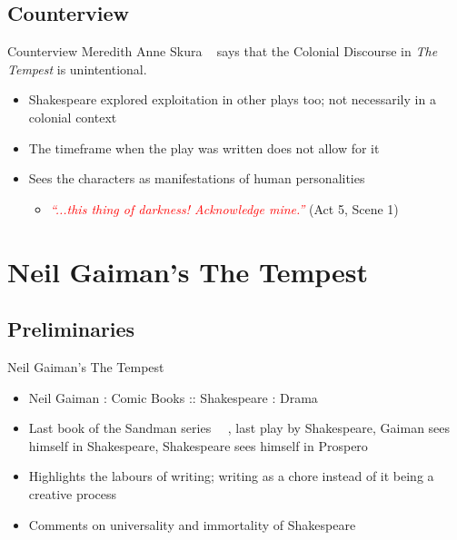 \documentclass{beamer}
\begin{document}
  \subsection{Counterview}
  \begin{frame}{Counterview}
  Meredith Anne Skura ~\cite{1989} says that the Colonial Discourse in \emph{The Tempest} is unintentional. 
  \begin{itemize}
  \item Shakespeare explored exploitation in other plays too; not necessarily in a colonial context
  \item The timeframe when the play was written does not allow for it
  \item Sees the characters as manifestations of human personalities
    \begin{itemize}
    \item \textcolor{red}{\emph{``...this thing of darkness! Acknowledge mine.''}} (Act 5, Scene 1)
    \end{itemize}
  \end{itemize}
  \end{frame}

  \section{Neil Gaiman's The Tempest}
  \subsection{Preliminaries}
  \begin{frame}{Neil Gaiman's The Tempest}
    \begin{itemize}
      \item Neil Gaiman : Comic Books :: Shakespeare : Drama
      \item Last book of the Sandman series ~\cite{gaimanmnd}~\cite{gaimantempest}, last play by Shakespeare, Gaiman sees himself in Shakespeare, Shakespeare sees himself in Prospero
      \item Highlights the labours of writing; writing as a chore instead of it being a creative process
      \item Comments on universality and immortality of Shakespeare
    \end{itemize}
  \end{frame}
  
\end{document}
